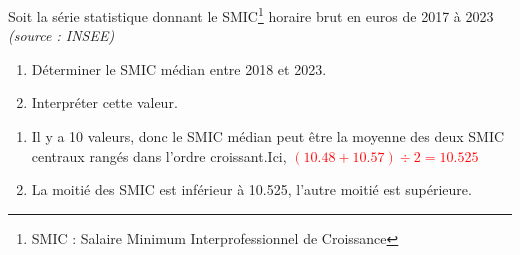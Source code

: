 \begin{exercice*}
    Soit la série statistique donnant le SMIC\footnote[1]{SMIC : Salaire Minimum Interprofessionnel de Croissance} horaire brut en euros de 2017 à 2023 \textit{(source : INSEE)}



    \begin{enumerate}
        \item Déterminer le SMIC médian entre 2018 et 2023.
        \item Interpréter cette valeur.
    \end{enumerate}
\end{exercice*}
\begin{corrige}
    \begin{enumerate}
        \item Il y a 10 valeurs, donc le SMIC médian peut être la moyenne des deux SMIC centraux rangés dans l'ordre croissant.Ici, \textcolor{red}{$(\num{10.48}+\num{10.57})\div 2= \num{10.525}$}
        \item La moitié des SMIC est inférieur à \num{10.525}, l'autre moitié est supérieure.
    \end{enumerate}
\end{corrige}

